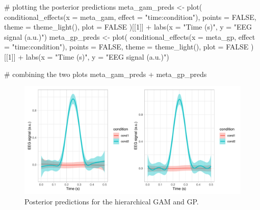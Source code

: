 \documentclass[
  doc,
  floatsintext,
  longtable,
  a4paper,
  nolmodern,
  notxfonts,
  notimes,
  colorlinks=true,linkcolor=blue,citecolor=blue,urlcolor=blue]{apa7}
\newenvironment{Shaded}{\begin{snugshade}}{\end{snugshade}}
\newcommand{\AttributeTok}[1]{\textcolor[rgb]{0.40,0.45,0.13}{#1}}
\newcommand{\CommentTok}[1]{\textcolor[rgb]{0.37,0.37,0.37}{#1}}
\newcommand{\ConstantTok}[1]{\textcolor[rgb]{0.56,0.35,0.01}{#1}}
\newcommand{\DecValTok}[1]{\textcolor[rgb]{0.68,0.00,0.00}{#1}}
\newcommand{\FunctionTok}[1]{\textcolor[rgb]{0.28,0.35,0.67}{#1}}
\newcommand{\NormalTok}[1]{\textcolor[rgb]{0.00,0.23,0.31}{#1}}
\newcommand{\OtherTok}[1]{\textcolor[rgb]{0.00,0.23,0.31}{#1}}
\newcommand{\SpecialCharTok}[1]{\textcolor[rgb]{0.37,0.37,0.37}{#1}}
\newcommand{\StringTok}[1]{\textcolor[rgb]{0.13,0.47,0.30}{#1}}
\begin{document}
\begin{Shaded}
\begin{Highlighting}[]
\CommentTok{\# plotting the posterior predictions}
\NormalTok{meta\_gam\_preds }\OtherTok{\textless{}{-}} \FunctionTok{plot}\NormalTok{(}
    \FunctionTok{conditional\_effects}\NormalTok{(}\AttributeTok{x =}\NormalTok{ meta\_gam, }\AttributeTok{effect =} \StringTok{"time:condition"}\NormalTok{),}
    \AttributeTok{points =} \ConstantTok{FALSE}\NormalTok{, }\AttributeTok{theme =} \FunctionTok{theme\_light}\NormalTok{(), }\AttributeTok{plot =} \ConstantTok{FALSE}
\NormalTok{    )[[}\DecValTok{1}\NormalTok{]] }\SpecialCharTok{+}
    \FunctionTok{labs}\NormalTok{(}\AttributeTok{x =} \StringTok{"Time (s)"}\NormalTok{, }\AttributeTok{y =} \StringTok{"EEG signal (a.u.)"}\NormalTok{)}
\NormalTok{meta\_gp\_preds }\OtherTok{\textless{}{-}} \FunctionTok{plot}\NormalTok{(}
    \FunctionTok{conditional\_effects}\NormalTok{(}\AttributeTok{x =}\NormalTok{ meta\_gp, }\AttributeTok{effect =} \StringTok{"time:condition"}\NormalTok{),}
    \AttributeTok{points =} \ConstantTok{FALSE}\NormalTok{, }\AttributeTok{theme =} \FunctionTok{theme\_light}\NormalTok{(), }\AttributeTok{plot =} \ConstantTok{FALSE}
\NormalTok{    )[[}\DecValTok{1}\NormalTok{]] }\SpecialCharTok{+}
    \FunctionTok{labs}\NormalTok{(}\AttributeTok{x =} \StringTok{"Time (s)"}\NormalTok{, }\AttributeTok{y =} \StringTok{"EEG signal (a.u.)"}\NormalTok{)}

\CommentTok{\# combining the two plots}
\NormalTok{meta\_gam\_preds }\SpecialCharTok{+}\NormalTok{ meta\_gp\_preds}
\end{Highlighting}
\end{Shaded}

\begin{figure}[H]

\caption{Posterior predictions for the hierarchical GAM and GP.}

{\centering \includegraphics[width=1\textwidth,height=\textheight]{brms_meeg_files/figure-pdf/meta-gp-preds-1.pdf}

}

\end{figure}%
\end{document}
